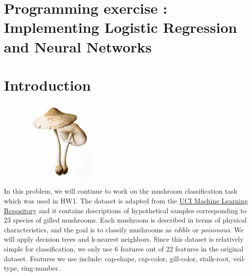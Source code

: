 \newpage
\section{Programming exercise : Implementing Logistic Regression and Neural Networks }

\section*{Introduction}

\begin{figure}[ht]
\centering
\includegraphics[scale=2.5]{mushroom.jpg}
\end{figure}

In this problem, we will continue to work on the mushroom classification task which was used in HW1. The dataset is adapted from the \href{https://archive.ics.uci.edu/ml/datasets/mushroom}{UCI Machine Learning Repository} and it contains descriptions of hypothetical samples corresponding to 23 species of gilled mushrooms. Each mushroom is described in terms of physical characteristics, and the goal is to classify mushrooms as \emph{edible} or \emph{poisonous}. We will apply decision trees and k-nearest neighbors. Since this dataset is relatively simple for classification, we only use 6 features out of 22 features in the original dataset. Features we use include: 
cap-shape, cap-color, gill-color, stalk-root, veil-type, ring-number.

